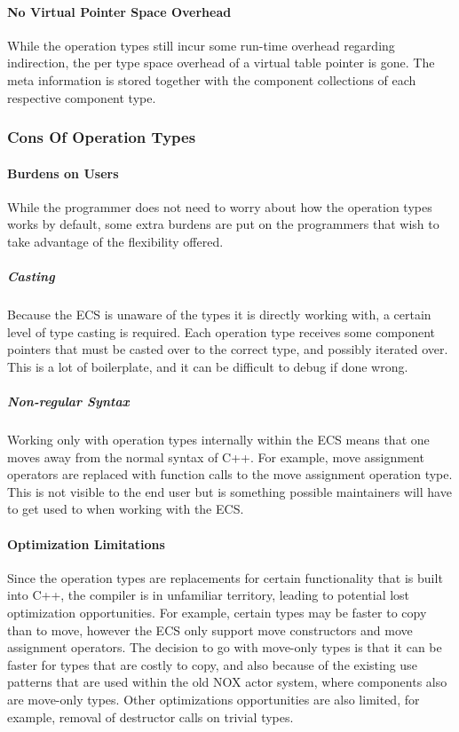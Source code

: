 \paragraph{No Virtual Pointer Space Overhead}
While the operation types still incur some run-time overhead regarding indirection, the per type space overhead of a virtual table pointer is gone.
The meta information is stored together with the component collections of each respective component type.

\subsubsection{Cons Of Operation Types}
\paragraph{Burdens on Users}
While the programmer does not need to worry about how the operation types works by default,
some extra burdens are put on the programmers that wish to take advantage of the flexibility offered.

\subparagraph{Casting}
Because the ECS is unaware of the types it is directly working with, a certain level of type casting is required.
Each operation type receives some component pointers that must be casted over to the correct type, and possibly iterated over. 
This is a lot of boilerplate, and it can be difficult to debug if done wrong.

\subparagraph{Non-regular Syntax}
Working only with operation types internally within the ECS means that one moves away from the normal syntax of C++.
For example, move assignment operators are replaced with function calls to the move assignment operation type.
This is not visible to the end user but is something possible maintainers will have to get used to when working with the ECS.

\paragraph{Optimization Limitations}
Since the operation types are replacements for certain functionality that is built into C++, the compiler is in
unfamiliar territory, leading to potential lost optimization opportunities.
For example, certain types may be faster to copy than to move, however the ECS only support move constructors and move assignment operators.
The decision to go with move-only types is that it can be faster for types that are costly to copy, and also because of the existing use patterns that are used within the old NOX actor system, where components also are move-only types.
Other optimizations opportunities are also limited, for example, removal of destructor calls on trivial types.


